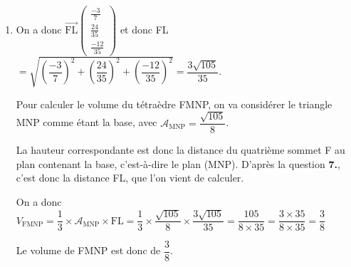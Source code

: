 \documentclass[10pt]{article}
\providecommand{\vect}[1]{\overrightarrow{#1}}
\begin{document}
\begin{enumerate}
Le point de paramètre $\dfrac{-3}{35}$ sur $d$ a pour coordonnées : $\left(1 + 5\times \dfrac{-3}{35}~;~-8\times \dfrac{-3}{35}~;~1 + 4\times \dfrac{-3}{35}\right) $, c'est donc bien le point L, de coordonnées  L$\left(\dfrac47~~;~~\dfrac{24}{35}~~;~~\dfrac{23}{35}\right)$.

\item On a donc $\vect{\mathrm{FL}}\begin{pmatrix} \frac{-3}7\\ \frac{24}{35}\\ \frac{-12}{35}	\end{pmatrix}$ et donc FL $= \sqrt{\left(\dfrac{-3}{7}\right)^2 + \left(\dfrac{24}{35}\right)^2 + \left(\dfrac{-12}{35}\right)^2 } = \dfrac{3\sqrt{105}}{35}$.

Pour calculer le volume du tétraèdre FMNP, on va considérer le triangle MNP comme étant la base, avec $\mathcal{A}_{\mathrm{MNP}} =\dfrac{\sqrt{105}}{8} $.

La hauteur correspondante est donc la distance du quatrième sommet F au plan contenant la base, c'est-à-dire le plan (MNP). D'après la question \textbf{7.}, c'est donc la distance FL, que l'on vient de calculer.

On a donc $ V_{\mathrm{FMNP}} = \dfrac{1}{3} \times \mathcal{A}_{\mathrm{MNP}} \times \mathrm{FL} = \dfrac{1}{3}\times \dfrac{\sqrt{105}}{8} \times \dfrac{3\sqrt{105}}{35} = \dfrac{105}{8\times 35} = \dfrac{3\times 35}{8\times 35 } = \dfrac{3}{8}$

Le volume de FMNP est donc de $\dfrac{3}{8}$.
\end{enumerate}

\medskip
\end{document}
